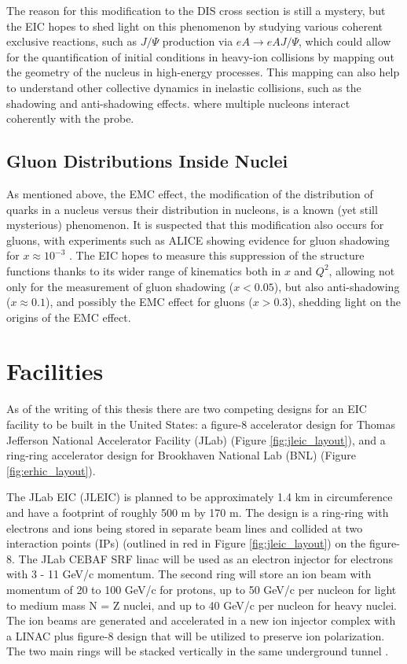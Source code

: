 The reason for this modification to the DIS cross section is still a mystery, but the EIC hopes to shed light on this phenomenon by studying various coherent exclusive reactions, such as $J/\Psi$ production via $eA \rightarrow eAJ/\Psi$, which could allow for the quantification of initial conditions in heavy-ion collisions by mapping out the geometry of the nucleus in high-energy processes. This mapping can also help to understand other collective dynamics in inelastic collisions, such as the shadowing and anti-shadowing effects. where multiple nucleons interact coherently with the probe.

\subsection{Gluon Distributions Inside Nuclei}
As mentioned above, the EMC effect, the modification of the distribution of quarks in a nucleus versus their distribution in nucleons, is a known (yet still mysterious) phenomenon. It is suspected that this modification also occurs for gluons, with experiments such as ALICE showing evidence for gluon shadowing for $x \approx 10^{-3}$ \cite{ALICE_antishadowing}. The EIC hopes to measure this suppression of the structure functions thanks to its wider range of kinematics both in $x$ and $Q^2$, allowing not only for the measurement of gluon shadowing ($x < 0.05$), but also anti-shadowing ($x \approx 0.1$), and possibly the EMC effect for gluons ($x > 0.3$), shedding light on the origins of the EMC effect.

\section{Facilities}
As of the writing of this thesis there are two competing designs for an EIC facility to be built in the United States: a figure-8 accelerator design for Thomas Jefferson National Accelerator Facility (JLab) (Figure \ref{fig:jleic_layout}), and a ring-ring accelerator design for Brookhaven National Lab (BNL) (Figure \ref{fig:erhic_layout}).

The JLab EIC (JLEIC) is planned to be approximately 1.4 km in circumference and have a footprint of roughly 500 m by 170 m. The design is a ring-ring with electrons and ions being stored in separate beam lines and collided at two interaction points  (IPs) (outlined in red in Figure \ref{fig:jleic_layout}) on the figure-8. The JLab CEBAF SRF linac will be used as an electron injector for electrons with 3 - 11 GeV/c momentum. The second ring will store an ion beam with momentum of 20 to 100 GeV/c for protons, up to 50 GeV/c per nucleon for light to medium mass N = Z nuclei, and up to 40 GeV/c per nucleon for heavy nuclei. The ion beams are generated and accelerated in a new ion injector complex with a LINAC plus figure-8 design that will be utilized to preserve ion polarization. The two main rings will be stacked vertically in the same underground tunnel \cite{JLEICdesign}.

